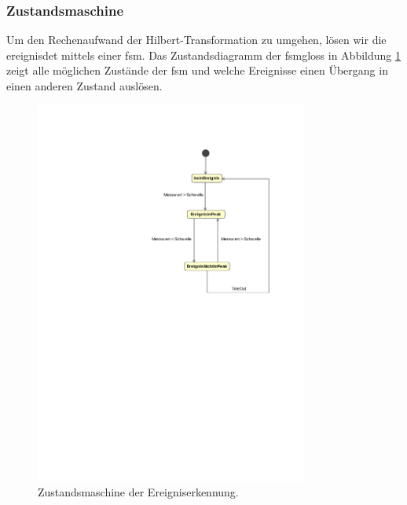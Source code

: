 \subsubsection{Zustandsmaschine}
Um den Rechenaufwand der Hilbert-Transformation zu umgehen, lösen wir die \gls{ereignisdet} mittels einer \gls{fsm}. Das Zustandsdiagramm der \gls{fsmgloss} in Abbildung \ref{fig.fsm_impact_detection} zeigt alle möglichen Zustände der \gls{fsm} und welche Ereignisse einen Übergang in einen anderen Zustand auslösen.
\begin{figure}[H]
	\centering
		\includegraphics[width=0.8\textwidth]{images/magicdraw/Ereigniserkennung.pdf}
	\caption{Zustandsmaschine der Ereigniserkennung.}
	\label{fig.fsm_impact_detection}
\end{figure}

